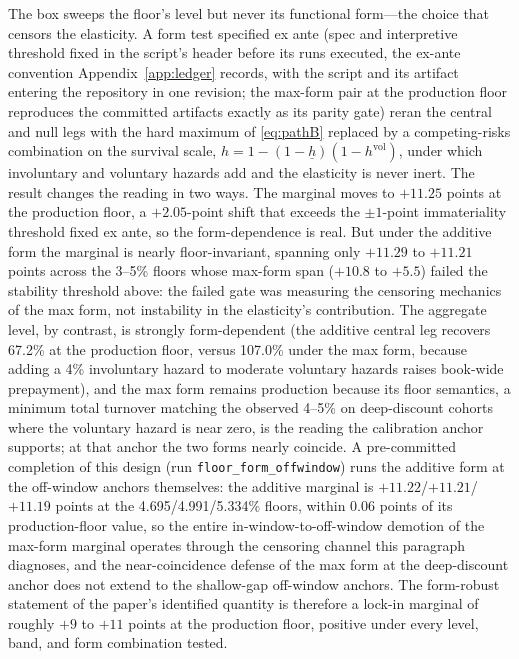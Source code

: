 \documentclass[12pt]{article}
\begin{document}
The box sweeps the floor's level but never its functional form---the choice that censors the elasticity. A form test specified ex ante (spec and interpretive threshold fixed in the script's header before its runs executed, the ex-ante convention Appendix~\ref{app:ledger} records, with the script and its artifact entering the repository in one revision; the max-form pair at the production floor reproduces the committed artifacts exactly as its parity gate) reran the central and null legs with the hard maximum of \eqref{eq:pathB} replaced by a competing-risks combination on the survival scale, $h = 1 - (1 - \underline{h})(1 - h^{\mathrm{vol}})$, under which involuntary and voluntary hazards add and the elasticity is never inert. The result changes the reading in two ways. The marginal moves to $+11.25$ points at the production floor, a $+2.05$-point shift that exceeds the $\pm 1$-point immateriality threshold fixed ex ante, so the form-dependence is real. But under the additive form the marginal is nearly floor-invariant, spanning only $+11.29$ to $+11.21$ points across the 3--5\% floors whose max-form span ($+10.8$ to $+5.5$) failed the stability threshold above: the failed gate was measuring the censoring mechanics of the max form, not instability in the elasticity's contribution. The aggregate level, by contrast, is strongly form-dependent (the additive central leg recovers 67.2\% at the production floor, versus 107.0\% under the max form, because adding a 4\% involuntary hazard to moderate voluntary hazards raises book-wide prepayment), and the max form remains production because its floor semantics, a minimum total turnover matching the observed 4--5\% on deep-discount cohorts where the voluntary hazard is near zero, is the reading the calibration anchor supports; at that anchor the two forms nearly coincide. A pre-committed completion of this design (run \texttt{floor\_form\_offwindow}) runs the additive form at the off-window anchors themselves: the additive marginal is $+11.22$/$+11.21$/$+11.19$ points at the 4.695/4.991/5.334\% floors, within 0.06 points of its production-floor value, so the entire in-window-to-off-window demotion of the max-form marginal operates through the censoring channel this paragraph diagnoses, and the near-coincidence defense of the max form at the deep-discount anchor does not extend to the shallow-gap off-window anchors. The form-robust statement of the paper's identified quantity is therefore a lock-in marginal of roughly $+9$ to $+11$ points at the production floor, positive under every level, band, and form combination tested.
\end{document}
